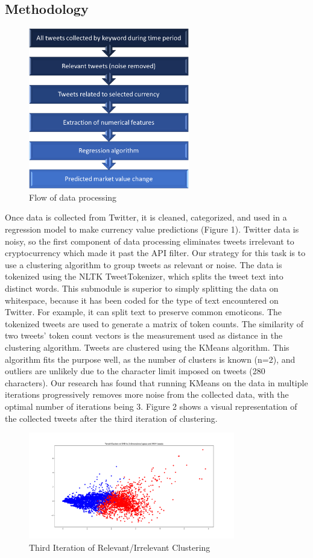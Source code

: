 \documentclass[sigconf]{acmart}
\begin{document}
\subsection{Methodology}

\begin{figure}[H]
\caption{Flow of data processing}
\includegraphics[width=7cm]{chart.png}
\end{figure}

Once data is collected from Twitter, it is cleaned, categorized, and used in a regression model to make currency value predictions (Figure 1). Twitter data is noisy, so the first component of data processing eliminates tweets irrelevant to cryptocurrency which made it past the API filter. Our strategy for this task is to use a clustering algorithm to group tweets as relevant or noise. The data is tokenized using the NLTK TweetTokenizer, which splits the tweet text into distinct words. This submodule is superior to simply splitting the data on whitespace, because it has been coded for the type of text encountered on Twitter. For example, it can split text to preserve common emoticons. The tokenized tweets are used to generate a matrix of token counts. The similarity of two tweets' token count vectors is the measurement used as distance in the clustering algorithm. Tweets are clustered using the KMeans algorithm. This algorithm fits the purpose well, as the number of clusters is known (n=2), and outliers are unlikely due to the character limit imposed on tweets (280 characters). Our research has found that running KMeans on the data in multiple iterations progressively removes more noise from the collected data, with the optimal number of iterations being 3. Figure 2 shows a visual representation of the collected tweets after the third iteration of clustering.

\begin{figure}[H]
\caption{Third Iteration of Relevant/Irrelevant Clustering}
\includegraphics[width=9cm]{3pass.png}
\end{figure}
\end{document}

